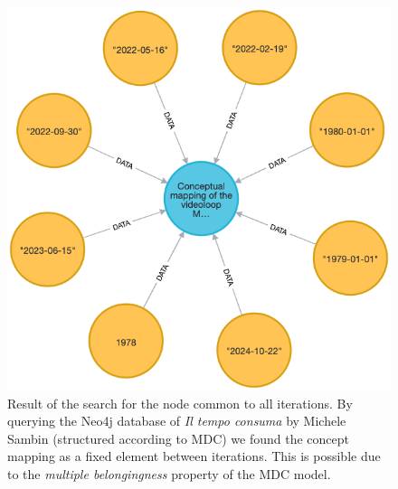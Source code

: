 \begin{figure}[!h]
    \centering
    \includegraphics[width=0.75\linewidth]{chapters/4-MDC_model_application/image/neo4j-multiplebel02.png}
    \caption{Result of the search for the node common to all iterations. By querying the Neo4j database of \textit{Il tempo consuma} by Michele Sambin (structured according to MDC) we found the concept mapping as a fixed element between iterations. This is possible due to the \textit{multiple belongingness} property of the MDC model.}
    \label{fig:c4-neo4j-multiplebel02}
\end{figure}

